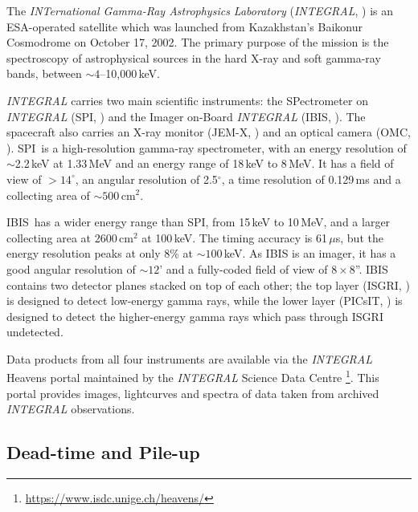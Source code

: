 \par The \textit{INTernational Gamma-Ray Astrophysics Laboratory} (\textit{INTEGRAL}\indexintegral, \citealp{Winkler_INTEGRAL}) is an ESA-operated satellite which was launched from Kazakhstan's Baikonur Cosmodrome on October 17, 2002.  The primary purpose of the mission is the spectroscopy of astrophysical sources in the hard X-ray and soft gamma-ray bands, between $\sim4$--10,000\,keV.
\par \textit{INTEGRAL} carries two main scientific instruments: the SPectrometer on \textit{INTEGRAL} (SPI\indexspi, \citealp{Vedrenne_SPI}) and the Imager on-Board \textit{INTEGRAL} (IBIS\indexibis, \citealp{Winkler_IBIS}).  The spacecraft also carries an X-ray monitor (JEM-X\indexjemx, \citealp{Schnopper_JEMX}) and an optical camera (OMC\indexomc, \citealp{Gimenez_OMC}).  SPI\indexspi\ is a high-resolution gamma-ray spectrometer, with an energy resolution of $\sim$2.2\,keV at 1.33\,MeV and an energy range of 18\,keV to 8\,MeV.  It has a field of view of $>14^\circ$, an angular resolution of 2.5$^\circ$, a time resolution of 0.129\,ms and a collecting area of $\sim500$\,cm$^2$.
\par IBIS\indexibis\ has a wider energy range than SPI\indexspi, from 15\,keV to 10\,MeV, and a larger collecting area at 2600\,cm$^2$ at 100\,keV.  The timing accuracy is 61\,$\mu$s, but the energy resolution peaks at only 8\% at $\sim100$\,keV.  As IBIS is an imager, it has a good angular resolution of $\sim12$' and a fully-coded field of view of $8\times8$''.  IBIS contains two detector planes stacked on top of each other; the top layer (ISGRI, \citealp{Lebrun_ISGRI}) is designed to detect low-energy gamma rays, while the lower layer (PICsIT, \citealp{Labanti_Picsit}) is designed to detect the higher-energy gamma rays which pass through ISGRI undetected.
\par Data products from all four instruments are available via the \textit{INTEGRAL} Heavens portal \citep{Lubinski_Heavens} maintained by the \textit{INTEGRAL} Science Data Centre \footnote{\url{https://www.isdc.unige.ch/heavens/}}.  This portal provides images, lightcurves and spectra of data taken from archived \textit{INTEGRAL} observations.

\subsection{Dead-time and Pile-up}

\label{sec:pude}

